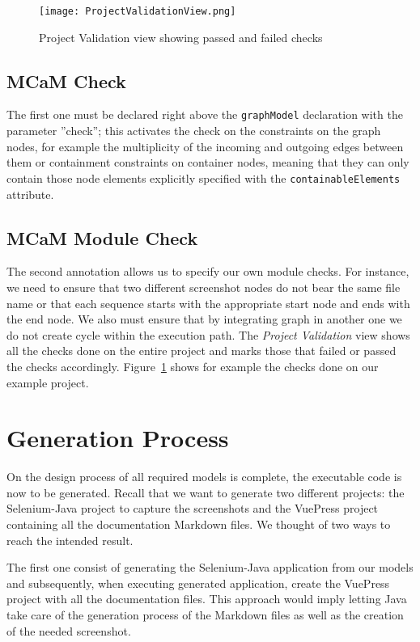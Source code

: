 \begin{figure}[h]
    \centering
    \texttt{[image: ProjectValidationView.png]}
    \caption{Project Validation view showing passed and failed checks}
    \label{fig:modelChecks}
\end{figure}

\subsection{MCaM Check}\label{sec:mcamCheck}

The first one must be declared right above the \lstinline[language=MGL]{graphModel} declaration with the parameter ''check''; this activates the check on the constraints on the graph nodes, for example the multiplicity of the incoming and outgoing edges between them or containment constraints on container nodes, meaning that they can only contain those node elements explicitly specified with the \lstinline[language=MGL]{containableElements} attribute. 

\subsection{MCaM Module Check}\label{sec:mcamModCheck}
The second annotation allows us to specify our own module checks. For instance, we need to ensure that two different screenshot nodes do not bear the same file name or that each sequence starts with the appropriate start node and ends with the end node. We also must ensure that by integrating graph in another one we do not create cycle within the execution path. The \textit{Project Validation} view shows all the checks done on the entire project and marks those that failed or passed the checks accordingly. Figure~\ref{fig:modelChecks} shows for example the checks done on our example project.

\section{Generation Process}\label{sec:GenProcess}

On the design process of all required models is complete, the executable code is now to be generated. Recall that we want to generate two different projects: the Selenium-Java project to capture the screenshots and the VuePress project containing all the documentation Markdown files. We thought of two ways to reach the intended result.

The first one consist of generating the Selenium-Java application from our models and subsequently, when executing generated application, create the VuePress project with all the documentation files. This approach would imply letting Java take care of the generation process of the Markdown files as well as the creation of the needed screenshot.

